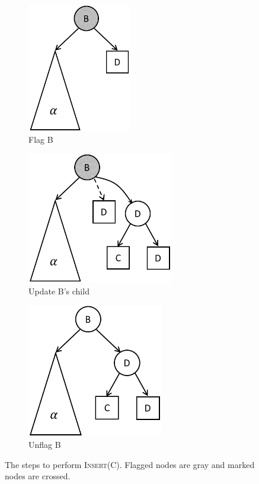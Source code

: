 \documentclass[letterpaper,twocolumn]{article}
\begin{document}
\begin{figure}[!tb]
	\centering
	\begin{subfigure}[b]{0.3\textwidth}\centering
		\includegraphics[width=0.5\textwidth]{bst_ins_2.png} %
		\caption{Flag B}
	\end{subfigure}
	\quad
	\begin{subfigure}[b]{0.3\textwidth}\centering
		\includegraphics[width=0.7\textwidth]{bst_ins_3.png} %
		\caption{Update B's child}
	\end{subfigure}
	\quad
	\begin{subfigure}[b]{0.3\textwidth}\centering
		\includegraphics[width=0.65\textwidth]{bst_ins_4.png} %
		\caption{Unflag B}
	\end{subfigure}
	\caption{The steps to perform \textsc{Insert}(C). Flagged nodes are gray and marked nodes are crossed.}\label{fig_bst_insert}
\end{figure}
\end{document}
